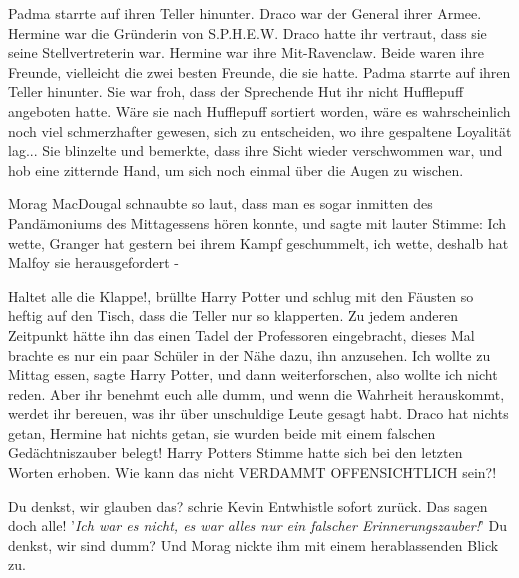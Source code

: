 Padma starrte auf ihren Teller hinunter. Draco war der General ihrer Armee.
Hermine war die Gründerin von S.P.H.E.W. Draco hatte ihr vertraut, dass sie
seine Stellvertreterin war. Hermine war ihre Mit-Ravenclaw. Beide waren ihre
Freunde, vielleicht die zwei besten Freunde, die sie hatte. Padma starrte auf
ihren Teller hinunter. Sie war froh, dass der Sprechende Hut ihr nicht
Hufflepuff angeboten hatte. Wäre sie nach Hufflepuff sortiert worden, wäre es
wahrscheinlich noch viel schmerzhafter gewesen, sich zu entscheiden, wo ihre
gespaltene Loyalität lag... Sie blinzelte und bemerkte, dass ihre Sicht wieder
verschwommen war, und hob eine zitternde Hand, um sich noch einmal über die
Augen zu wischen.

Morag MacDougal schnaubte so laut, dass man es sogar inmitten des Pandämoniums
des Mittagessens hören konnte, und sagte mit lauter Stimme: \glqq Ich wette,
Granger hat gestern bei ihrem Kampf geschummelt, ich wette, deshalb hat Malfoy
sie herausgefordert -\grqq{}

\glqq Haltet alle die Klappe!\grqq{}, brüllte Harry Potter und schlug mit den
Fäusten so heftig auf den Tisch, dass die Teller nur so klapperten. Zu jedem
anderen Zeitpunkt hätte ihn das einen Tadel der Professoren eingebracht, dieses
Mal brachte es nur ein paar Schüler in der Nähe dazu, ihn anzusehen. \glqq Ich
wollte zu Mittag essen\grqq{}, sagte Harry Potter, \glqq und dann
weiterforschen, also wollte ich nicht reden. Aber ihr benehmt euch alle dumm,
und wenn die Wahrheit herauskommt, werdet ihr bereuen, was ihr über unschuldige
Leute gesagt habt. Draco hat nichts getan, Hermine hat nichts getan, sie wurden
beide mit einem falschen Gedächtniszauber belegt!\grqq{} Harry Potters Stimme
hatte sich bei den letzten Worten erhoben. \glqq Wie kann das nicht VERDAMMT
OFFENSICHTLICH sein?!\grqq{}

\glqq Du denkst, wir glauben das?\grqq{} schrie Kevin Entwhistle sofort zurück.
\glqq Das sagen doch alle! '\emph{Ich war es nicht, es war alles nur ein
falscher Erinnerungszauber!}' Du denkst, wir sind dumm?\grqq{} Und Morag nickte
ihm mit einem herablassenden Blick zu.

